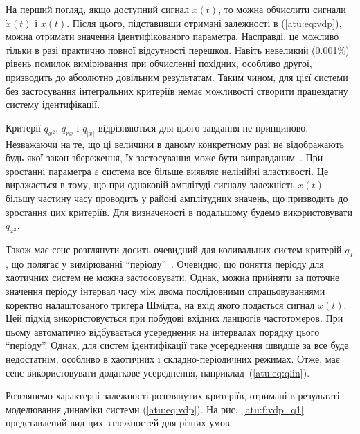 На перший погляд, якщо доступний сигнал
$x(t)$, то можна обчислити сигнали
$\dot{x}(t) $ і
$\ddot{x}(t)$. Після цього, підставивши отримані залежності
в (\ref{atu:eq:vdp}), можна отримати значення ідентифікованого
параметра. Насправді, це можливо тільки в разі практично
повної відсутності перешкод. Навіть невеликий (0.001\%) рівень
помилок вимірювання при обчисленні похідних, особливо другої,
призводить до абсолютно довільним результатам. Таким чином,
для цієї системи без застосування інтегральних критеріїв
немає можливості створити працездатну систему ідентифікації.

Критерії
$q_{x^2} $,
$q_{rx} $ і
$q_{|x|} $ відрізняються для цього завдання не
принципово. Незважаючи на те, що ці величини в даному конкретному
разі не відображають будь-якої закон збереження, їх застосування
може бути виправданим~\cite{atu_asau17}. При зростанні параметра
$ \varepsilon $ система все більше виявляє нелінійні властивості. Це
виражається в тому, що при однаковій амплітуді сигналу
залежність
$x(t)$ більшу частину часу проводить у районі амплітудних
значень, що призводить до зростання цих критеріїв. Для
визначеності в подальшому будемо використовувати
$q_{x^2}$.

Також має сенс розглянути досить очевидний для коливальних
систем критерій
$q_T$, що полягає у вимірюванні ``періоду''~\cite{atu_asau16}. Очевидно, що
поняття періоду для хаотичних систем не можна застосовувати. Однак,
можна прийняти за поточне значення періоду інтервал часу між
двома послідовними спрацьовуваннями коректно налаштованого
тригера Шмідта, на вхід якого подається сигнал
$x(t)$. Цей підхід використовується при побудові вхідних
ланцюгів частотомеров. При цьому автоматично відбувається
усереднення на інтервалах порядку цього ``періоду''. Однак,
для систем ідентифікації таке усереднення швидше за все
буде недостатнім, особливо в хаотичних і складно-періодичних
режимах. Отже, має сенс використовувати додаткове усереднення,
наприклад~(\ref{atu:eq:qlin}).

Розглянемо характерні залежності розглянутих критеріїв,
отримані в результаті моделювання динаміки системи
(\ref{atu:eq:vdp}). На рис.~\ref{atu:f:vdp_q1} представлений вид цих залежностей
для різних умов.


